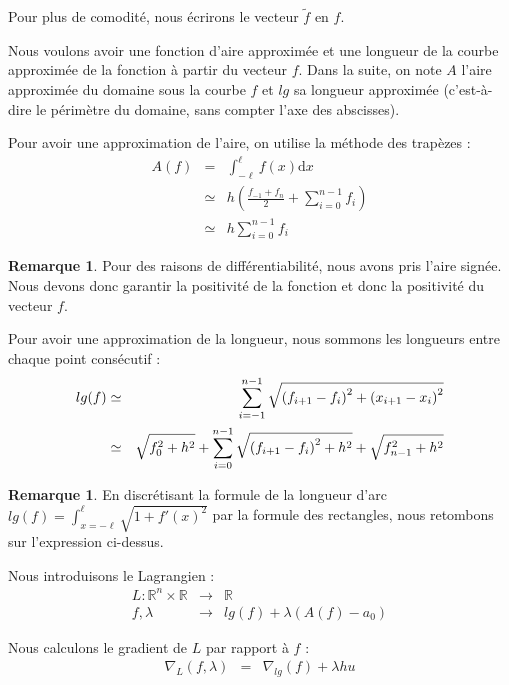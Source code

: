 \documentclass[10pt,a4paper]{article}
\newcommand{\R}{\mathbb{R}}
\renewcommand{\d}{\mathrm{d}}
\renewcommand{\ss}{\vspace*{\baselineskip}}
\theoremstyle{plain}
\theoremstyle{definition}
\newtheorem{rem}[thm]{Remarque}
\begin{document}
Pour plus de comodité, nous écrirons le vecteur $\tilde{f}$ en $f$.

\ss

Nous voulons avoir une fonction d'aire approximée et une longueur de la courbe approximée de la fonction à partir du vecteur $f$. Dans la suite, on note $A$ l'aire approximée du domaine sous la courbe $f$ et $lg$ sa longueur approximée (c'est-à-dire le périmètre du domaine, sans compter l'axe des abscisses).

Pour avoir une approximation de l'aire, on utilise la méthode des trapèzes :
\begin{eqnarray*}
A(f) &=& \int_{-\ell}^{\ell}{f(x)\d x} \\
&\simeq& h \left(\frac{f_{-1}+f_n}{2} + \sum_{i=0}^{n-1}{f_i}\right) \\
&\simeq& h \sum_{i=0}^{n-1}{f_i}
\end{eqnarray*}

\begin{rem}
Pour des raisons de différentiabilité, nous avons pris l'aire signée. Nous devons donc garantir la positivité de la fonction et donc la positivité du vecteur $f$.
\end{rem}

Pour avoir une approximation de la longueur, nous sommons les longueurs entre chaque point consécutif :
\begin{eqnarray*}
lg(f) &\simeq& \sum_{i=-1}^{n-1}{\sqrt{\vphantom{f_n^2}{(f_{i+1}-f_i)}^2+{(x_{i+1}-x_i)}^2}}\\
&\simeq& \sqrt{f_0^2+h^2} + \sum_{i=0}^{n-1}{\sqrt{\vphantom{f_n^2}{(f_{i+1}-f_i)}^2+h^2}} + \sqrt{f_{n-1}^2+h^2} 
\end{eqnarray*}

\begin{rem}
En discrétisant la formule de la longueur d'arc $lg(f)=\int_{x=-\ell}^{\ell}{\sqrt{1+f'(x)^2}}$ par la formule des rectangles, nous retombons sur l'expression ci-dessus.
\end{rem}

Nous introduisons le Lagrangien :
\begin{eqnarray*}
L \colon \R^n \times \R &\rightarrow & \R \\
f, \lambda &\rightarrow & lg(f) + \lambda (A(f)-a_0)
\end{eqnarray*}

Nous calculons le gradient de $L$ par rapport à $f$ :
\begin{eqnarray*}
\nabla_L(f, \lambda) & = & \nabla_{lg}(f) + \lambda h u
\end{eqnarray*}
\end{document}

